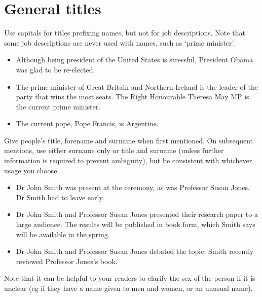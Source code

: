 \documentclass[11pt,a4paper]{book}
\newcommand{\xmark}{{\color{cadmiumred}\ding{54}}}%
\newcommand{\cmark}{{\color{green(html/cssgreen)}\checkmark}}%
\begin{document}
		\section{General titles}
		Use capitals for titles prefixing names, but not for job descriptions. Note that some job descriptions are never used with names, such as `prime minister'.
		{\firasans \begin{mdframed}[backgroundcolor=aliceblue] \begin{itemize}[label=\cmark]
			\item Although being president of the United States is stressful, President Obama was glad to be re-elected.
			\item The prime minister of Great Britain and Northern Ireland is the leader of the party that wins the most seats. The Right Honourable Theresa May MP is the current prime minister.
			\item The current pope, Pope Francis, is Argentine.
		\end{itemize} \end{mdframed} }
		Give people's title, forename and surname when first mentioned. On subsequent mentions, use either surname only or title and surname (unless further information is required to prevent ambiguity), but be consistent with whichever usage you choose.
	{\firasans \begin{mdframed}[backgroundcolor=aliceblue] \begin{itemize}[label=\cmark]
		\item Dr John Smith was present at the ceremony, as was Professor Susan Jones. Dr Smith had to leave early.
		\item Dr John Smith and Professor Susan Jones presented their research paper to a large audience. The results will be published in book form, which Smith says will be available in the spring.
		\item[\xmark] Dr John Smith and Professor Susan Jones debated the topic. Smith recently reviewed Professor Jones's book.
	\end{itemize} \end{mdframed} }
	Note that it can be helpful to your readers to clarify the sex of the person if it is unclear (eg if they have a name given to men and women, or an unusual name).
\end{document}
